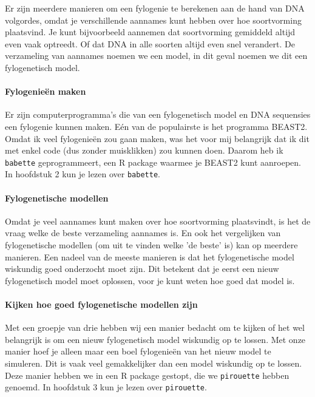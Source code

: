 {Er zijn meerdere manieren om een fylogenie te berekenen 
aan de hand van DNA volgordes, omdat je verschillende
aannames kunt hebben over hoe soortvorming plaatsvind.
Je kunt bijvoorbeeld aannemen dat soortvorming gemiddeld altijd
even vaak optreedt. Of dat DNA in alle soorten altijd even snel
verandert. De verzameling van aannames noemen we een model,
in dit geval noemen we dit een fylogenetisch model.

\paragraph{Fylogenieën maken}

Er zijn computerprogramma's die van een fylogenetisch model en DNA
sequensies een fylogenie kunnen maken. Eén van de populairste is
het programma BEAST2. Omdat ik veel fylogenieën zou gaan maken, 
was het voor mij belangrijk dat ik dit met enkel code (dus zonder 
muisklikken) zou kunnen doen. Daarom heb ik \verb;babette;
geprogrammeert, een R package waarmee je BEAST2 kunt aanroepen.
In hoofdstuk 2 kun je lezen over \verb;babette;.

\paragraph{Fylogenetische modellen}

Omdat je veel aannames kunt maken over hoe soortvorming plaatsvindt,
is het de vraag welke de beste verzameling aannames is.
En ook het vergelijken van fylogenetische modellen (om uit te vinden
welke 'de beste' is) kan op meerdere manieren. 
Een nadeel van de meeste manieren is dat het fylogenetische model
wiskundig goed onderzocht moet zijn. 
Dit betekent dat je eerst een nieuw fylogenetisch model moet oplossen,
voor je kunt weten hoe goed dat model is.

\paragraph{Kijken hoe goed fylogenetische modellen zijn}

Met een groepje van drie hebben wij een manier bedacht om
te kijken of het wel belangrijk is om een nieuw fylogenetisch
model wiskundig op te lossen.
Met onze manier hoef je alleen maar een boel fylogenieën
van het nieuw model te simuleren.
Dit is vaak veel gemakkelijker dan een model wiskundig op te lossen.
Deze manier hebben we in een R package gestopt, die we
\verb;pirouette; hebben genoemd. In hoofdstuk 3 kun je lezen
over \verb;pirouette;.

}
